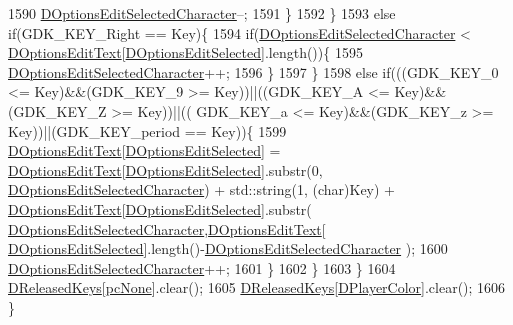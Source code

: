 \begin{DoxyCode}
1590                    \hyperlink{classCApplicationData_a921d69021fc61e51d12d8a26a5ac1a89}{DOptionsEditSelectedCharacter}--; 
1591                 \}
1592             \}
1593             \textcolor{keywordflow}{else} \textcolor{keywordflow}{if}(GDK\_KEY\_Right == Key)\{
1594                 \textcolor{keywordflow}{if}(\hyperlink{classCApplicationData_a921d69021fc61e51d12d8a26a5ac1a89}{DOptionsEditSelectedCharacter} < 
      \hyperlink{classCApplicationData_a7044dc34cbd9d6776e8ef79eb12b5ce4}{DOptionsEditText}[\hyperlink{classCApplicationData_aee4aa5eb5b89b86eb2648d0f9c7358f9}{DOptionsEditSelected}].length())\{
1595                    \hyperlink{classCApplicationData_a921d69021fc61e51d12d8a26a5ac1a89}{DOptionsEditSelectedCharacter}++; 
1596                 \}
1597             \}
1598             \textcolor{keywordflow}{else} \textcolor{keywordflow}{if}(((GDK\_KEY\_0 <= Key)&&(GDK\_KEY\_9 >= Key))||((GDK\_KEY\_A <= Key)&&(GDK\_KEY\_Z >= Key))||((
      GDK\_KEY\_a <= Key)&&(GDK\_KEY\_z >= Key))||(GDK\_KEY\_period == Key))\{
1599                 \hyperlink{classCApplicationData_a7044dc34cbd9d6776e8ef79eb12b5ce4}{DOptionsEditText}[\hyperlink{classCApplicationData_aee4aa5eb5b89b86eb2648d0f9c7358f9}{DOptionsEditSelected}] = 
      \hyperlink{classCApplicationData_a7044dc34cbd9d6776e8ef79eb12b5ce4}{DOptionsEditText}[\hyperlink{classCApplicationData_aee4aa5eb5b89b86eb2648d0f9c7358f9}{DOptionsEditSelected}].substr(0,
      \hyperlink{classCApplicationData_a921d69021fc61e51d12d8a26a5ac1a89}{DOptionsEditSelectedCharacter}) + std::string(1, (\textcolor{keywordtype}{char})Key) + 
      \hyperlink{classCApplicationData_a7044dc34cbd9d6776e8ef79eb12b5ce4}{DOptionsEditText}[\hyperlink{classCApplicationData_aee4aa5eb5b89b86eb2648d0f9c7358f9}{DOptionsEditSelected}].substr(
      \hyperlink{classCApplicationData_a921d69021fc61e51d12d8a26a5ac1a89}{DOptionsEditSelectedCharacter},\hyperlink{classCApplicationData_a7044dc34cbd9d6776e8ef79eb12b5ce4}{DOptionsEditText}[
      \hyperlink{classCApplicationData_aee4aa5eb5b89b86eb2648d0f9c7358f9}{DOptionsEditSelected}].length()-\hyperlink{classCApplicationData_a921d69021fc61e51d12d8a26a5ac1a89}{DOptionsEditSelectedCharacter}
      );
1600                 \hyperlink{classCApplicationData_a921d69021fc61e51d12d8a26a5ac1a89}{DOptionsEditSelectedCharacter}++;
1601             \}
1602         \}
1603     \}
1604     \hyperlink{classCApplicationData_adcef59167cadd8ee516884a7c0df08f6}{DReleasedKeys}[\hyperlink{GameDataTypes_8h_aafb0ca75933357ff28a6d7efbdd7602fa88767aa8e02c7b3192bbab4127b3d729}{pcNone}].clear();
1605     \hyperlink{classCApplicationData_adcef59167cadd8ee516884a7c0df08f6}{DReleasedKeys}[\hyperlink{classCApplicationData_a53550939b20cba70570f113e4d1c5d02}{DPlayerColor}].clear();
1606 \}                   
\end{DoxyCode}
